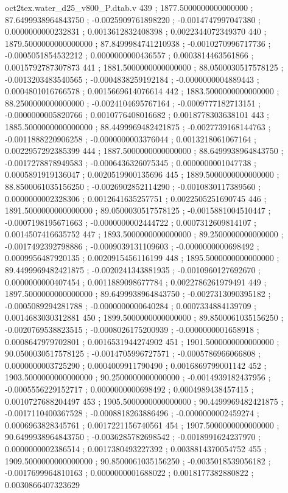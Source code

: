 \begin{filecontents}[overwrite]{oct2tex.water_d25_v800_P.dtab.v}
439 ; 1877.5000000000000000 ; 87.6499938964843750 ; -0.0025909761898220 ; -0.0014747997047380 ; 0.0000000000232831 ; 0.0013612832408398 ; 0.0022344072349370
440 ; 1879.5000000000000000 ; 87.8499984741210938 ; -0.0010270996717736 ; -0.0005051854532212 ; 0.0000000000436557 ; 0.0003814463561866 ; 0.0015792787307873
441 ; 1881.5000000000000000 ; 88.0500030517578125 ; -0.0013203483540565 ; -0.0004838259192184 ; -0.0000000004889443 ; 0.0004801016766578 ; 0.0015669614076614
442 ; 1883.5000000000000000 ; 88.2500000000000000 ; -0.0024104695767164 ; -0.0009777182713151 ; -0.0000000005820766 ; 0.0010776408016682 ; 0.0018778303638101
443 ; 1885.5000000000000000 ; 88.4499969482421875 ; -0.0027739168144763 ; -0.0011888220906258 ; -0.0000000003376044 ; 0.0013218061067164 ; 0.0022957292385399
444 ; 1887.5000000000000000 ; 88.6499938964843750 ; -0.0017278878949583 ; -0.0006436326075345 ; 0.0000000001047738 ; 0.0005891919136047 ; 0.0020519900135696
445 ; 1889.5000000000000000 ; 88.8500061035156250 ; -0.0026902852114290 ; -0.0010830117389560 ; 0.0000000002328306 ; 0.0012641635257751 ; 0.0022505251690745
446 ; 1891.5000000000000000 ; 89.0500030517578125 ; -0.0015881004510447 ; -0.0007198195671663 ; -0.0000000002444722 ; 0.0007312609814107 ; 0.0014507416635752
447 ; 1893.5000000000000000 ; 89.2500000000000000 ; -0.0017492392798886 ; -0.0009039131109603 ; -0.0000000000698492 ; 0.0009956487920135 ; 0.0020915456116199
448 ; 1895.5000000000000000 ; 89.4499969482421875 ; -0.0020241343881935 ; -0.0010960127692670 ; 0.0000000000407454 ; 0.0011889098677784 ; 0.0022786261979491
449 ; 1897.5000000000000000 ; 89.6499938964843750 ; -0.0027313090395182 ; -0.0005089294281788 ; -0.0000000000640284 ; 0.0007334884139709 ; 0.0014683030312881
450 ; 1899.5000000000000000 ; 89.8500061035156250 ; -0.0020769538823515 ; -0.0008026175200939 ; -0.0000000001658918 ; 0.0008647979702801 ; 0.0016531944274902
451 ; 1901.5000000000000000 ; 90.0500030517578125 ; -0.0014705996727571 ; -0.0005786966066808 ; 0.0000000003725290 ; 0.0004009911790490 ; 0.0016869799001142
452 ; 1903.5000000000000000 ; 90.2500000000000000 ; -0.0014939182437956 ; -0.0005556229152717 ; 0.0000000000698492 ; 0.0004989438457415 ; 0.0010727688204497
453 ; 1905.5000000000000000 ; 90.4499969482421875 ; -0.0017110400367528 ; -0.0008818263886496 ; -0.0000000002459274 ; 0.0006963828345761 ; 0.0017221156740561
454 ; 1907.5000000000000000 ; 90.6499938964843750 ; -0.0036285782698542 ; -0.0018991624237970 ; 0.0000000002386514 ; 0.0017380493227392 ; 0.0038814370054752
455 ; 1909.5000000000000000 ; 90.8500061035156250 ; -0.0035018539056182 ; -0.0017699964810163 ; 0.0000000001688022 ; 0.0018177382880822 ; 0.0030866407323629

\end{filecontents}

